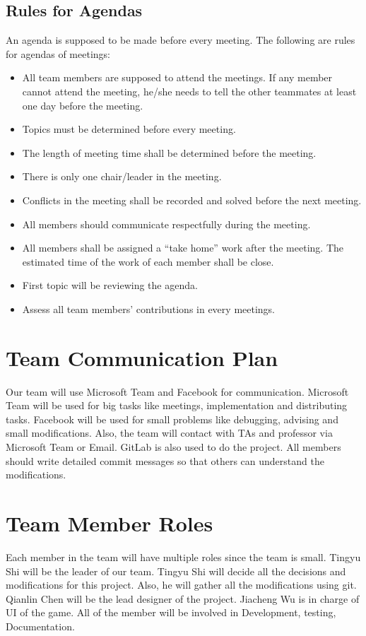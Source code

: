 \documentclass[12pt]{article}
\begin{document}
\subsection{Rules for Agendas}
\noindent An agenda is supposed to be made before every meeting. The following
are rules for agendas of meetings:
\begin{itemize}
\item All team members are supposed to attend the meetings. If any member cannot attend the meeting, he/she needs to tell the other teammates at least one day before the meeting.
\item Topics must be determined before every meeting.
\item The length of meeting time shall be determined before the meeting.
\item There is only one chair/leader in the meeting.
\item Conflicts in the meeting shall be recorded and solved before the next meeting.
\item All members should communicate respectfully during the meeting.
\item All members shall be assigned a “take home” work after the meeting. The estimated time of the work of each member shall be close.
\item First topic will be reviewing the agenda.
\item Assess all team members’ contributions in every meetings.
\end{itemize}
\section{Team Communication Plan}
Our team will use Microsoft Team and
Facebook for communication. Microsoft Team
will be used for big tasks like
meetings, implementation and distributing
tasks. Facebook will be used for small problems like
debugging, advising and small modifications.
Also, the team will contact with TAs and
professor via Microsoft Team or Email. GitLab is also
used to do the project. All members should write detailed commit messages so that
others can understand the modifications.


\section{Team Member Roles}
Each member in the team will have multiple roles since the team is small. Tingyu Shi will be the leader of our team. Tingyu Shi will decide all the decisions and modifications for this project. Also, he will gather all the modifications using git. Qianlin Chen will be the lead designer of the project. Jiacheng Wu is in charge of UI of the game. All of the member will be involved in Development, testing, Documentation. 
\end{document}
